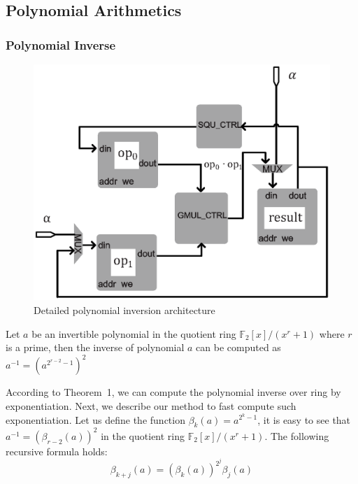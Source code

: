 \documentclass[runningheads]{llncs}
\begin{document}
\subsection{Polynomial Arithmetics}
\subsubsection{Polynomial Inverse}
\begin{figure}[!tb]
\centering
\includegraphics[width=.55\textwidth]{./fig/inv_unit.eps}
\caption{Detailed polynomial inversion architecture}\label{fig:inverter}
\end{figure}

\begin{theorem}
Let $a$ be an invertible polynomial in the quotient ring $\mathbb{F}_2[x]/(x^r+1)$ where $r$ is a prime, then the inverse of polynomial $a$ can be computed as $a^{-1}=(a^{2^{r-2}-1})^2$
\end{theorem}

According to Theorem~1, we can compute the polynomial inverse over ring by exponentiation. Next, we describe our method to fast compute such exponentiation. Let us define the function $\beta_{k}(a)=a^{2^k-1}$, it is easy to see that $a^{-1}=(\beta_{r-2}(a))^2$ in the quotient ring $\mathbb{F}_2[x]/(x^r+1)$. The following recursive
formula holds:
\[
    \beta_{k+j}(a)=(\beta_{k}(a))^{2^j}\beta_{j}(a)
\]
\end{document}
